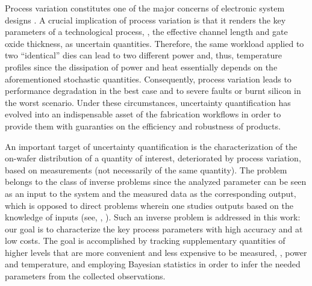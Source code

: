 Process variation constitutes one of the major concerns of electronic system designs \cite{chandrakasan2001, srivastava2010}. A crucial implication of process variation is that it renders the key parameters of a technological process, \eg, the effective channel length and gate oxide thickness, as uncertain quantities.
Therefore, the same workload applied to two ``identical'' dies can lead to two different power and, thus, temperature profiles since the dissipation of power and heat essentially depends on the aforementioned stochastic quantities.
Consequently, process variation leads to performance degradation in the best case and to severe faults or burnt silicon in the worst scenario.
Under these circumstances, uncertainty quantification has evolved into an indispensable asset of the fabrication workflows in order to provide them with guaranties on the efficiency and robustness of products.

An important target of uncertainty quantification is the characterization of the on-wafer distribution of a quantity of interest, deteriorated by process variation, based on measurements (not necessarily of the same quantity).
The problem belongs to the class of inverse problems since the analyzed parameter can be seen as an input to the system and the measured data as the corresponding output, which is opposed to direct problems wherein one studies outputs based on the knowledge of inputs (see, \eg, \cite{juan2011, juan2012}).
Such an inverse problem is addressed in this work: our goal is to characterize the key process parameters with high accuracy and at low costs.
The goal is accomplished by tracking supplementary quantities of higher levels that are more convenient and less expensive to be measured, \eg, power and temperature, and employing Bayesian statistics \cite{gelman2004} in order to infer the needed parameters from the collected observations.

